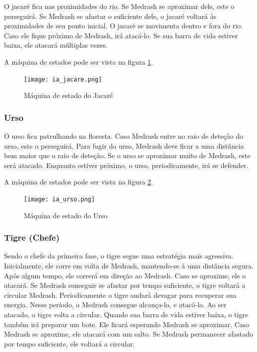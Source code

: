 O jacaré fica nas proximidades do rio. Se Medrash se aproximar dele,
este o perseguirá. Se Medrash se afastar o suficiente dele, o jacaré voltará às proximidades de seu ponto inicial.
O jacaré se movimenta dentro e fora do rio. Caso ele fique próximo de
Medrash, irá atacá-lo. Se sua barra de vida estiver baixa, ele atacará
múltiplas vezes.

A máquina de estados pode ser vista na figura \ref{fsm:jacare}.

\begin{figure}[!ht]
 \centering
 \texttt{[image: ia\_jacare.png]}
 \caption{Máquina de estado do Jacaré}
 \label{fsm:jacare}
\end{figure}

\subsubsection{Urso}

O urso fica patrulhando na floresta. Caso Medrash entre no raio de deteção
do urso, este o perseguirá. Para fugir do urso, Medrash deve ficar a uma
distância bem maior que o raio de deteção.
Se o urso se aproximar muito de Medrash, este será atacado. Enquanto estiver
próximo, o urso, periodicamente, irá se defender.

A máquina de estados pode ser vista na figura \ref{fsm:urso}.

\begin{figure}[!ht]
 \centering
 \texttt{[image: ia\_urso.png]}
 \caption{Máquina de estado do Urso}
 \label{fsm:urso}
\end{figure}

\subsubsection{Tigre (Chefe)}

Sendo o chefe da primeira fase, o tigre segue uma estratégia mais agressiva.
Inicialmente, ele corre em volta de Medrash, mantendo-se à uma distância
 segura. Após algum tempo, ele correrá em direção ao Medrash. Caso se
 aproxime, ele o atacará. Se Medrash conseguir se afastar por tempo
 suficiente, o tigre voltará a circular Medrash.
Periodicamente o tigre andará devagar para recuperar sua energia. Nesse
período, o Medrash consegue alcança-lo, e atacá-lo. Ao ser atacado, o tigre
volta a circular.
Quando sua barra de vida estiver baixa, o tigre também irá preparar um
bote. Ele ficará esperando Medrash se aproximar. Caso Medrash se aproxime,
 ele atacará com um salto. Se Medrash permanecer afastado por tempo 
suficiente, ele voltará a circular.

